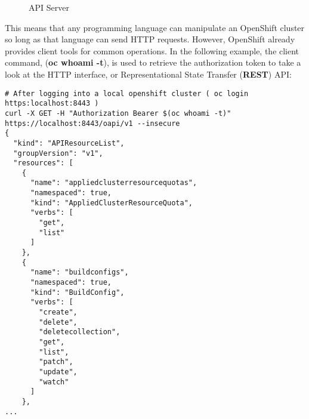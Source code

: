\documentclass{article}
\begin{document}
\begin{figure}
\begin{tikzpicture}[node distance = 1cm and 0cm]

  
  
   

\end{tikzpicture}
\caption{API Server}
\end{figure}

This means that any programming language can manipulate an OpenShift cluster so long as that
language can send HTTP requests. However, OpenShift already provides client tools for 
common operations. In the following example, the client command, (\textbf{oc whoami -t}), is used to 
retrieve the authorization token to take a look at the HTTP interface, or Representational 
State Transfer (\textbf{REST}) API:    

\begin{lstlisting}[style=shell]
# After logging into a local openshift cluster ( oc login https:localhost:8443 )
curl -X GET -H "Authorization Bearer $(oc whoami -t)" https://localhost:8443/oapi/v1 --insecure
{
  "kind": "APIResourceList",
  "groupVersion": "v1",
  "resources": [
    {
      "name": "appliedclusterresourcequotas",
      "namespaced": true,
      "kind": "AppliedClusterResourceQuota",
      "verbs": [
        "get",
        "list"
      ]
    }, 
    {
      "name": "buildconfigs",
      "namespaced": true,
      "kind": "BuildConfig",
      "verbs": [
        "create",
        "delete",
        "deletecollection",
        "get",
        "list",
        "patch",
        "update",
        "watch"
      ]
    },
...
\end{lstlisting}

\end{document}
